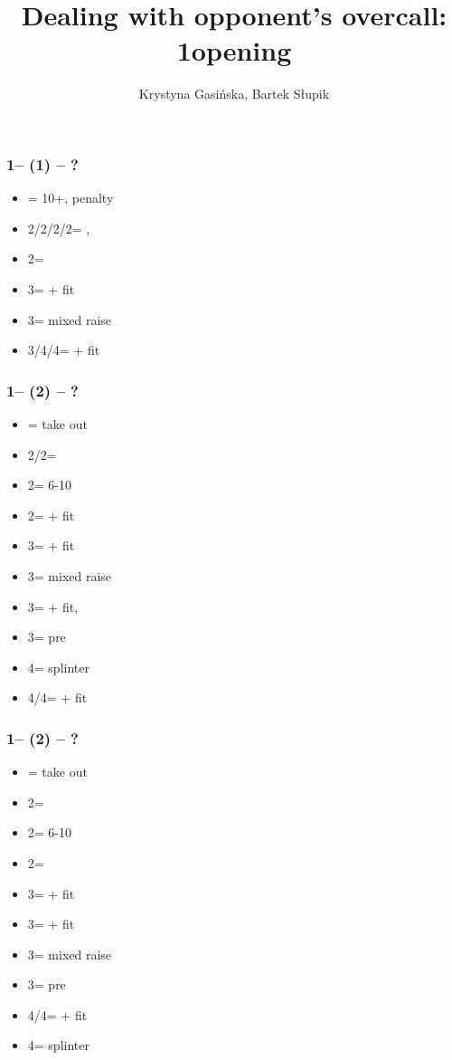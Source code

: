 \documentclass[12pt, a4paper]{article}
\title{Dealing with opponent's overcall: 1\spades opening}
\author{Krystyna Gasińska, Bartek Słupik}
\begin{document}
\maketitle


\subsubsection*{1\spades -- (1\nt) -- ?}
\begin{itemize}
    \item \dbl = 10+, penalty
    \item 2\clubs/2\diams/2\hearts/2\spades = \nat, \nf
    \item 2\nt = \minor
    \item 3\clubs = \inv + fit
    \item 3\diams = mixed raise
    \item 3\hearts/4\clubs/4\diams = \nat + fit
\end{itemize}

\subsubsection*{1\spades -- (2\clubs) -- ?}
\begin{itemize}
    \item \dbl = take out
    \item 2\diams/2\hearts = \fonce
    \item 2\spades = 6-10
    \item 2\nt = \gf + fit
    \item 3\clubs = \inv + fit
    \item 3\diams = mixed raise
    \item 3\hearts = \hearts + fit, \inv
    \item 3\spades = pre
    \item 4\clubs = splinter
    \item 4\diams/4\hearts = \nat + fit
\end{itemize}

\subsubsection*{1\spades -- (2\diams) -- ?}
\begin{itemize}
    \item \dbl = take out
    \item 2\hearts = \fonce
    \item 2\spades = 6-10
    \item 2\nt = \clubs \invp
    \item 3\clubs = \gf + fit
    \item 3\diams = \inv + fit
    \item 3\hearts = mixed raise
    \item 3\spades = pre
    \item 4\clubs/4\hearts = \nat + fit
    \item 4\diams = splinter
\end{itemize}
\end{document}
